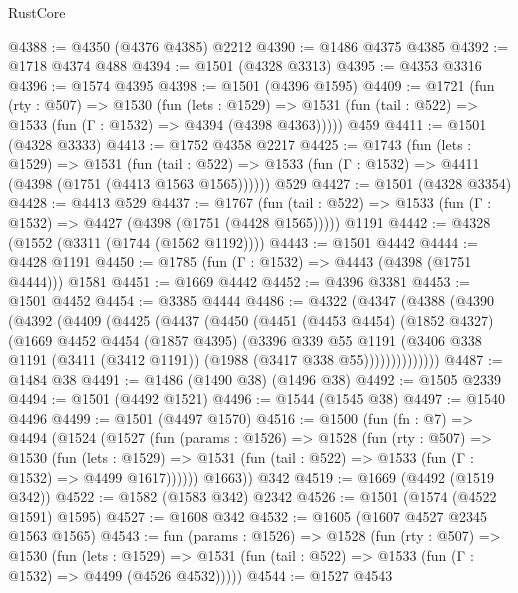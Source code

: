 \begin{lexlean}{RustCore}
\begin{coremodule}
@4388 := @4350 (@4376 @4385) @2212
@4390 := @1486 @4375 @4385
@4392 := @1718 @4374 @488
@4394 := @1501 (@4328 @3313)
@4395 := @4353 @3316
@4396 := @1574 @4395
@4398 := @1501 (@4396 @1595)
@4409 := @1721
    (fun (rty : @507) =>
    @1530
      (fun (lets : @1529) =>
      @1531 (fun (tail : @522) => @1533 (fun (Γ : @1532) => @4394 (@4398 @4363)))))
    @459
@4411 := @1501 (@4328 @3333)
@4413 := @1752 @4358 @2217
@4425 := @1743
    (fun (lets : @1529) =>
    @1531
      (fun (tail : @522) => @1533 (fun (Γ : @1532) => @4411 (@4398 (@1751 (@4413 @1563 @1565))))))
    @529
@4427 := @1501 (@4328 @3354)
@4428 := @4413 @529
@4437 := @1767
    (fun (tail : @522) => @1533 (fun (Γ : @1532) => @4427 (@4398 (@1751 (@4428 @1565)))))
    @1191
@4442 := @4328 (@1552 (@3311 (@1744 (@1562 @1192))))
@4443 := @1501 @4442
@4444 := @4428 @1191
@4450 := @1785 (fun (Γ : @1532) => @4443 (@4398 (@1751 @4444))) @1581
@4451 := @1669 @4442
@4452 := @4396 @3381
@4453 := @1501 @4452
@4454 := @3385 @4444
@4486 := @4322
    (@4347
      (@4388
        (@4390
          (@4392
            (@4409
              (@4425
                (@4437
                  (@4450
                    (@4451
                      (@4453 @4454)
                      (@1852 @4327)
                      (@1669
                        @4452
                        @4454
                        (@1857 @4395)
                        (@3396
                          @339
                          @55
                          @1191
                          (@3406
                            @338
                            @1191
                            (@3411 (@3412 @1191))
                            (@1988 (@3417 @338 @55))))))))))))))
@4487 := @1484 @38
@4491 := @1486 (@1490 @38) (@1496 @38)
@4492 := @1505 @2339
@4494 := @1501 (@4492 @1521)
@4496 := @1544 (@1545 @38)
@4497 := @1540 @4496
@4499 := @1501 (@4497 @1570)
@4516 := @1500
    (fun (fn : @7) =>
    @4494
      (@1524
        (@1527
          (fun (params : @1526) =>
          @1528
            (fun (rty : @507) =>
            @1530
              (fun (lets : @1529) =>
              @1531 (fun (tail : @522) => @1533 (fun (Γ : @1532) => @4499 @1617))))))
        @1663))
    @342
@4519 := @1669 (@4492 (@1519 @342))
@4522 := @1582 (@1583 @342) @2342
@4526 := @1501 (@1574 (@4522 @1591) @1595)
@4527 := @1608 @342
@4532 := @1605 (@1607 @4527 @2345 @1563 @1565)
@4543 := fun (params : @1526) =>
  @1528
    (fun (rty : @507) =>
    @1530
      (fun (lets : @1529) =>
      @1531 (fun (tail : @522) => @1533 (fun (Γ : @1532) => @4499 (@4526 @4532)))))
@4544 := @1527 @4543

\end{coremodule}
\end{lexlean}
